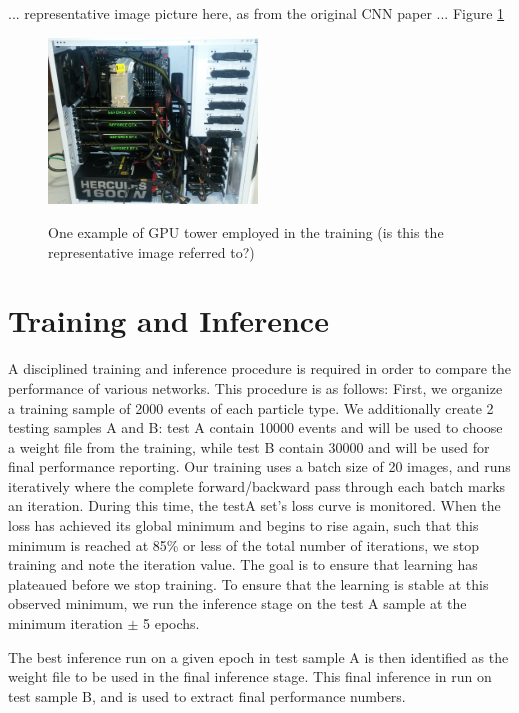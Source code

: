 \documentclass[11pt,a4paper]{article}
\begin{document}
... representative image picture here, as from the original CNN paper ... Figure \ref{fig:towerpower}

\begin{figure}[t]
  \centering  
\includegraphics[width=0.495\textwidth]{Figures/tower_power.png}\\
\caption{One example of GPU tower employed in the training (is this the representative image referred to?)}
  \label{fig:towerpower}
\end{figure}


\section {Training and Inference}

A disciplined training and inference procedure is required in order to compare the performance of various networks. This procedure is as follows: First, we organize a training sample of 2000 events of each particle type. We additionally create 2 testing samples A and B: test A contain 10000 events and will be used to choose a weight file from the training, while test B contain 30000 and will be used for final performance reporting.  Our training uses a batch size of 20 images, and runs iteratively where the complete forward/backward pass through each batch marks an iteration. During this time, the testA set's loss curve is monitored. When the loss has achieved its global minimum and begins to rise again, such that this minimum is reached at 85\% or less of the total number of iterations, we stop training and note the iteration value. The goal is to ensure that learning has plateaued before we stop training. To ensure that the learning is stable at this observed minimum, we run the inference stage on the test A sample at the minimum iteration $\pm$ 5 epochs.  

The best inference run on a given epoch in test sample A is then identified as the weight file to be used in the final inference stage. This final inference in run on test sample B, and is used to extract final performance numbers.
\end{document}

